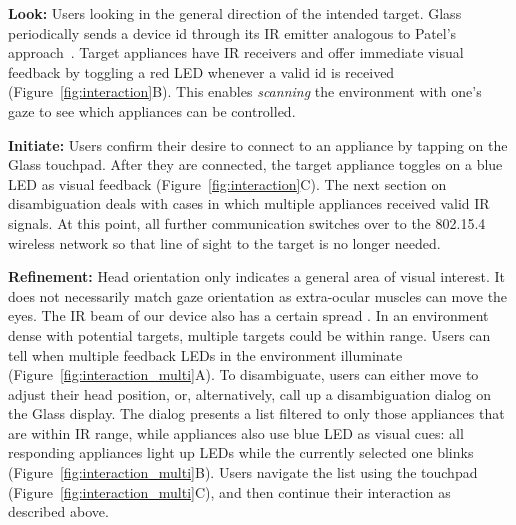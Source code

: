 {\bf Look:} Users looking in the general direction of the intended target.
Glass periodically sends a device id through its IR emitter analogous to Patel's approach~\cite{patel_2-way_2003}. Target appliances have IR receivers and offer immediate visual feedback by toggling a red LED whenever a valid id is received (Figure~\ref{fig:interaction}B). This enables {\em scanning} the environment with one's gaze to see which appliances can be controlled.

{\bf Initiate:} Users confirm their desire to connect to an appliance by tapping on the Glass touchpad. After they are connected, the target appliance toggles on a blue LED as visual feedback (Figure~\ref{fig:interaction}C). The next section on disambiguation deals with cases in which multiple appliances received valid IR signals. At this point, all further communication switches over to the 802.15.4 wireless network so that line of sight to the target is no longer needed.

{\bf Refinement:}
Head orientation only indicates a general area of visual interest. It does not necessarily match gaze orientation as extra-ocular muscles can move the eyes. The IR beam of our device also has a certain spread . In an environment dense with potential targets, multiple targets could be within range. Users can tell when multiple feedback LEDs in the environment illuminate (Figure~\ref{fig:interaction_multi}A). To disambiguate, users can either move to adjust their head position, or, alternatively, call up a disambiguation dialog on the Glass display. The dialog presents a list filtered to only those appliances that are within IR range, while appliances also use blue LED as visual cues: all responding appliances light up LEDs while the currently selected one blinks (Figure~\ref{fig:interaction_multi}B). Users navigate the list using the touchpad (Figure~\ref{fig:interaction_multi}C), and then continue their interaction as described above.

